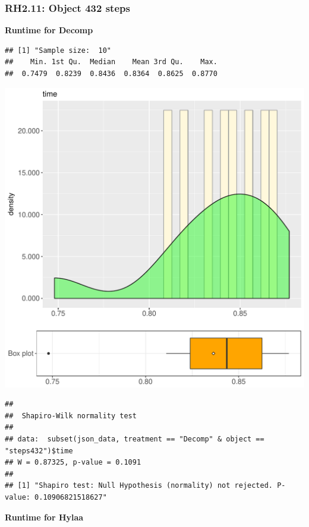 \documentclass{article}\usepackage[]{graphicx}\usepackage[]{color}
\makeatletter
\def\maxwidth{ %
  \ifdim\Gin@nat@width>\linewidth
    \linewidth
  \else
    \Gin@nat@width
  \fi
}
\newenvironment{kframe}{%
 \def\at@end@of@kframe{}%
 \ifinner\ifhmode%
  \def\at@end@of@kframe{\end{minipage}}%
  \begin{minipage}{\columnwidth}%
 \fi\fi%
 \def\FrameCommand##1{\hskip\@totalleftmargin \hskip-\fboxsep
 \colorbox{shadecolor}{##1}\hskip-\fboxsep
     \hskip-\linewidth \hskip-\@totalleftmargin \hskip\columnwidth}%
 \MakeFramed {\advance\hsize-\width
   \@totalleftmargin\z@ \linewidth\hsize
   \@setminipage}}%
 {\par\unskip\endMakeFramed%
 \at@end@of@kframe}
\newenvironment{knitrout}{}{} %
\makeatother
\begin{document}
\subsubsection{RH2.11: Object 432 steps}

 \textbf{Runtime for Decomp}
\begin{knitrout}
\color{fgcolor}\begin{kframe}
\begin{verbatim}
## [1] "Sample size:  10"
##    Min. 1st Qu.  Median    Mean 3rd Qu.    Max. 
##  0.7479  0.8239  0.8436  0.8364  0.8625  0.8770
\end{verbatim}
\end{kframe}
\includegraphics[width=\maxwidth]{figure/RH2_Decomp_steps432-1} 
\begin{kframe}\begin{verbatim}
## 
## 	Shapiro-Wilk normality test
## 
## data:  subset(json_data, treatment == "Decomp" & object == "steps432")$time
## W = 0.87325, p-value = 0.1091
## 
## [1] "Shapiro test: Null Hypothesis (normality) not rejected. P-value: 0.10906821518627"
\end{verbatim}
\end{kframe}
\end{knitrout}
 \textbf{Runtime for Hylaa}
\end{document}
